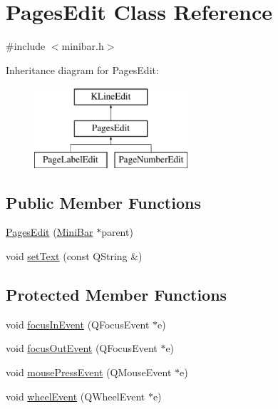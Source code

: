 \hypertarget{classPagesEdit}{\section{Pages\+Edit Class Reference}
\label{classPagesEdit}
}


{\ttfamily \#include $<$minibar.\+h$>$}

Inheritance diagram for Pages\+Edit\+:\begin{figure}[H]
\begin{center}
\leavevmode
\includegraphics[height=3.000000cm]{classPagesEdit}
\end{center}
\end{figure}
\subsection*{Public Member Functions}
\begin{DoxyCompactItemize}
\item 
\hyperlink{classPagesEdit_a3c8582f1992d34a6cd664b6a50824ce8}{Pages\+Edit} (\hyperlink{classMiniBar}{Mini\+Bar} $\ast$parent)
\item 
void \hyperlink{classPagesEdit_a1f4573d431b7fda9d8b690db903217d7}{set\+Text} (const Q\+String \&)
\end{DoxyCompactItemize}
\subsection*{Protected Member Functions}
\begin{DoxyCompactItemize}
\item 
void \hyperlink{classPagesEdit_aa3765e40ccb7bee68bf9d7595604dd38}{focus\+In\+Event} (Q\+Focus\+Event $\ast$e)
\item 
void \hyperlink{classPagesEdit_a8bce60425db7ec31a0cd9fa1dd7760cb}{focus\+Out\+Event} (Q\+Focus\+Event $\ast$e)
\item 
void \hyperlink{classPagesEdit_a4894262fa08ecda0a7094c167472cccc}{mouse\+Press\+Event} (Q\+Mouse\+Event $\ast$e)
\item 
void \hyperlink{classPagesEdit_a8dc7b71b59f600b53ea911d19ca9a122}{wheel\+Event} (Q\+Wheel\+Event $\ast$e)
\end{DoxyCompactItemize}



